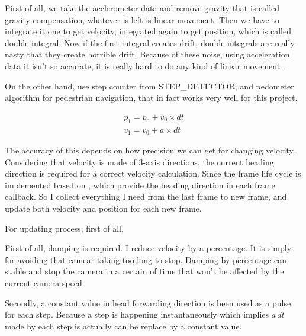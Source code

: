 First of all, we take the acclerometer data and remove gravity that is called gravity compensation, whatever is left is linear movement. Then we have to integrate it one to get velocity, integrated again to get position, which is called double integral. Now if the first integral creates drift, double integrals are really nasty that they create horrible drift. Because of these noise, using acceleration data it isn't so accurate, it is really hard to do any kind of linear movement \parencite{GoogleTechTalks.sensor-fusion.2010}.

On the other hand, use step counter from STEP\_DETECTOR, and pedometer algorithm for pedestrian navigation, that in fact works very well for this project.

\[
\begin{array}{lr}
p_1 = p_0 + v_0 \times dt \\
v_1 = v_0 + a \times dt
\end{array}
\]

The accuracy of this depends on how precision we can get for changing velocity. Considering that velocity is made of 3-axis directions, the current heading direction is required for a correct velocity calculation. Since the frame life cycle is implemented based on \parencite{Google.VR-SDK.2016}, which provide the heading direction in each frame callback. So I collect everything I need from the last frame to new frame, and update both velocity and position for each new frame.

For updating process, first of all, 

First of all, damping is required. I reduce velocity by a percentage. It is simply for avoiding that camear taking too long to stop. Damping by percentage can stable and stop the camera in a certain of time that won't be affected by the current camera speed. 


Secondly, a constant value in head forwarding direction is been used as a pulse for each step. Because a step is happening instantaneously which implies $a\,dt$ made by each step is actually can be replace by a constant value.

